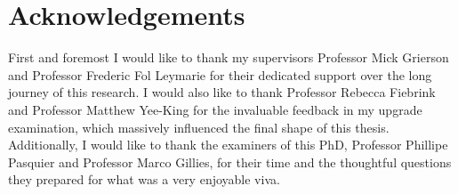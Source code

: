 \chapter*{Acknowledgements}

First and foremost I would like to thank my supervisors Professor Mick Grierson and Professor Frederic Fol Leymarie for their dedicated support over the long journey of this research. I would also like to thank Professor Rebecca Fiebrink and Professor Matthew Yee-King for the invaluable feedback in my upgrade examination, which massively influenced the final shape of this thesis. Additionally, I would like to thank the examiners of this PhD, Professor Phillipe Pasquier and Professor Marco Gillies, for their time and the thoughtful questions they prepared for what was a very enjoyable viva. 



